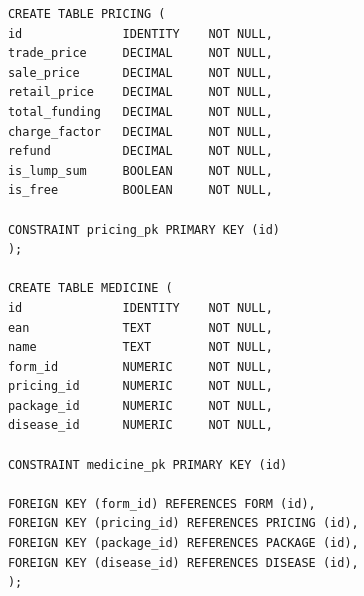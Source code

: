 \documentclass{article}
\begin{document}
  \begin{minipage}{.45\textwidth}
    \begin{lstlisting}
      CREATE TABLE PRICING (
      id              IDENTITY    NOT NULL,
      trade_price     DECIMAL     NOT NULL,
      sale_price      DECIMAL     NOT NULL,
      retail_price    DECIMAL     NOT NULL,
      total_funding   DECIMAL     NOT NULL,
      charge_factor   DECIMAL     NOT NULL,
      refund          DECIMAL     NOT NULL,
      is_lump_sum     BOOLEAN     NOT NULL,
      is_free         BOOLEAN     NOT NULL,

      CONSTRAINT pricing_pk PRIMARY KEY (id)
      );

      CREATE TABLE MEDICINE (
      id              IDENTITY    NOT NULL,
      ean             TEXT        NOT NULL,
      name            TEXT        NOT NULL,
      form_id         NUMERIC     NOT NULL,
      pricing_id      NUMERIC     NOT NULL,
      package_id      NUMERIC     NOT NULL,
      disease_id      NUMERIC     NOT NULL,

      CONSTRAINT medicine_pk PRIMARY KEY (id)

      FOREIGN KEY (form_id) REFERENCES FORM (id),
      FOREIGN KEY (pricing_id) REFERENCES PRICING (id),
      FOREIGN KEY (package_id) REFERENCES PACKAGE (id),
      FOREIGN KEY (disease_id) REFERENCES DISEASE (id),
      );
    \end{lstlisting}
  \end{minipage}
\end{document}
